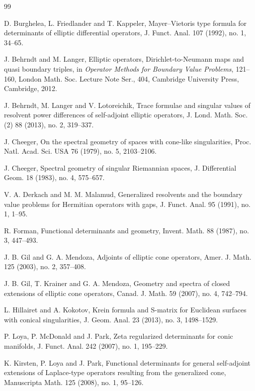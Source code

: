 \documentclass[12pt]{amsart}
\theoremstyle{plain}
\theoremstyle{definition}
\theoremstyle{remark}
\numberwithin{equation}{section} \numberwithin{figure}{section}
\begin{document}
\begin{thebibliography}{99}\large

D. Burghelea, L. Friedlander and T. Kappeler,
Mayer--Vietoris type formula for determinants of elliptic differential
operators,
J. Funct. Anal. 107 (1992), no. 1, 34--65.

J. Behrndt and M. Langer,
Elliptic operators, Dirichlet-to-Neumann maps and quasi boundary triples,
in \emph{Operator Methods for Boundary Value Problems}, 121--160,
London Math. Soc. Lecture Note Ser., 404,
Cambridge University Press, Cambridge, 2012.

J. Behrndt, M. Langer and V. Lotoreichik,
Trace formulae and singular values of resolvent power differences of
self-adjoint elliptic operators,
J. Lond. Math. Soc. (2) 88 (2013), no. 2, 319--337.

J. Cheeger,
On the spectral geometry of spaces with cone-like singularities,
Proc. Natl. Acad. Sci. USA 76 (1979), no. 5, 2103--2106.

J. Cheeger,
Spectral geometry of singular Riemannian spaces,
J. Differential Geom. 18 (1983), no. 4, 575--657.

V. A. Derkach and M. M. Malamud,
Generalized resolvents and the boundary value problems for Hermitian operators
with gaps,
J. Funct. Anal. 95 (1991), no. 1, 1--95.

R. Forman,
Functional determinants and geometry,
Invent. Math. 88 (1987), no. 3, 447--493.

J. B. Gil and G. A. Mendoza,
Adjoints of elliptic cone operators,
Amer. J. Math. 125 (2003), no. 2, 357--408.

J. B. Gil, T. Krainer and G. A. Mendoza,
Geometry and spectra of closed extensions of elliptic cone operators,
Canad. J. Math. 59 (2007), no. 4, 742--794.

L. Hillairet and A. Kokotov,
Krein formula and S-matrix for Euclidean surfaces with conical singularities,
J. Geom. Anal. 23 (2013), no. 3, 1498--1529.

P. Loya, P. McDonald and J. Park,
Zeta regularized determinants for conic manifolds,
J. Funct. Anal. 242 (2007), no. 1, 195--229.

K. Kirsten, P. Loya and J. Park,
Functional determinants for general self-adjoint extensions of Laplace-type
operators resulting from the generalized cone,
Manuscripta Math. 125 (2008), no. 1, 95--126.


\end{thebibliography}
\end{document}
